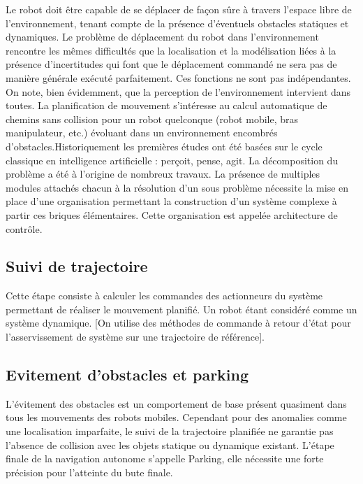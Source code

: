 Le robot doit être capable de se déplacer de façon sûre à travers l’espace libre de l’environnement, tenant compte de la présence d’éventuels obstacles statiques et dynamiques. Le problème de déplacement du robot dans l’environnement rencontre les mêmes difficultés que la localisation et la modélisation liées à la présence d’incertitudes qui font que le déplacement commandé ne sera pas de manière générale exécuté parfaitement.
Ces fonctions ne sont pas indépendantes. On note, bien évidemment, que la perception de l’environnement intervient dans toutes. La planification de mouvement s’intéresse au calcul automatique de chemins sans collision pour un robot quelconque (robot mobile, bras manipulateur, etc.) évoluant dans un environnement encombrés d’obstacles.Historiquement les premières études ont été basées sur le cycle classique en intelligence artificielle : perçoit, pense, agit.
La décomposition du problème a été à l’origine de nombreux travaux. La présence de multiples modules attachés chacun à la résolution d’un sous problème nécessite la mise en place d’une organisation permettant la construction d’un système complexe à partir ces briques élémentaires. Cette organisation est appelée architecture de contrôle.
\subsection{Suivi de trajectoire
}
Cette étape consiste à calculer les commandes des actionneurs du système permettant de réaliser le mouvement planifié. Un robot étant considéré comme un système dynamique. [On utilise des méthodes de commande à retour d’état pour l’asservissement de système sur une trajectoire de référence].
\subsection{Evitement d’obstacles et parking
}

L’évitement des obstacles est un comportement de base présent quasiment dans tous les mouvements des robots mobiles. Cependant pour des anomalies comme une localisation imparfaite, le suivi de la trajectoire planifiée ne garantie pas l’absence de collision avec les objets statique ou dynamique existant.
L’étape finale de la navigation autonome s’appelle Parking, elle nécessite une forte précision pour l’atteinte du bute finale.




